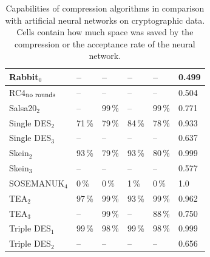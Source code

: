 \documentclass[
  print, %
  Table,   %
  nolof,     %
  nolot,     %
  11pt, %
  oneside  %
]{fithesis3}
\newcommand{\fd}{\cellcolor{myred!15}}
\newcommand{\fn}{\cellcolor{mygreen!20}}
\begin{document}
\begin{table}[H]
\begin{tabular}{@{}l|lllll}
Rabbit$_{0}$                     & --     \fn & --     \fn & --     \fn & --     \fn & 0.499 \fn \\ \hline
RC4$_{\textnormal{no rounds}}$   & --     \fn & --     \fn & --     \fn & --     \fn & 0.504 \fn \\ \hline
Salsa20$_{2}$                    & --     \fn & 99\,\% \fd & --     \fn & 99\,\% \fd & 0.771 \fd \\ \hline
Single DES$_{2}$                 & 71\,\% \fd & 79\,\% \fd & 84\,\% \fd & 78\,\% \fd & 0.933 \fd \\
Single DES$_{3}$                 & --     \fn & --     \fn & --     \fn & --     \fn & 0.637 \fd \\ \hline
Skein$_{2}$                      & 93\,\% \fd & 79\,\% \fd & 93\,\% \fd & 80\,\% \fd & 0.999 \fd \\ \hline
Skein$_{3}$                      & --     \fn & --     \fn & --     \fn & --     \fn & 0.577 \fd \\ \hline
SOSEMANUK$_{4}$                  & 0\,\%  \fd & 0\,\%  \fd & 1\,\%  \fd & 0\,\%  \fd & 1.0   \fd \\ \hline
TEA$_{2}$                        & 97\,\% \fd & 99\,\% \fd & 93\,\% \fd & 99\,\% \fd & 0.962 \fd \\
TEA$_{3}$                        & --     \fn & 99\,\% \fd & --     \fn & 88\,\% \fd & 0.750 \fd \\ \hline
Triple DES$_{1}$                 & 99\,\% \fd & 98\,\% \fd & 99\,\% \fd & 98\,\% \fd & 0.999 \fd \\
Triple DES$_{2}$                 & --     \fn & --     \fn & --     \fn & --     \fn & 0.656 \fd

\end{tabular}

\caption{Capabilities of compression algorithms in comparison with artificial neural networks on cryptographic data. Cells contain how much space was saved by the compression or the acceptance rate of the neural network.}
\label{table:res-compression}
\end{table}
\end{document}
